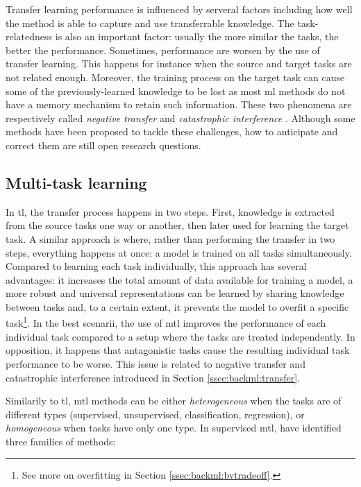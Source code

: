 Transfer learning performance is influenced by serveral factors including how well the method is able to capture and use transferrable knowledge. The task-relatedness is also an important factor: usually the more similar the tasks, the better the performance. Sometimes, performance are worsen by the use of transfer learning. This happens for instance when the source and target tasks are not related enough. Moreover, the training process on the target task can cause some of the previously-learned knowledge to be lost as most \acrlong{ml} methods do not have a memory mechanism to retain such information. These two phenomena are respectively called \textit{negative transfer} \parencite{zhang2020overcoming} and \textit{catastrophic interference} \parencite{french1999catastrophic}. Although some methods have been proposed to tackle these challenges, how to anticipate and correct them are still open research questions.

\subsection{Multi-task learning}
\label{ssec:backml:mtl}

In \acrlong{tl}, the transfer process happens in two steps. First, knowledge is extracted from the source tasks one way or another, then later used for learning the target task. A similar approach is  where, rather than performing the transfer in two steps, everything happens at once: a model is trained on all tasks simultaneously. Compared to learning each task individually, this approach has several advantages: it increases the total amount of data available for training a model, a more robust and universal representations can be learned by sharing knowledge between tasks and, to a certain extent, it prevents the model to overfit a specific task\footnote{See more on overfitting in Section \ref{ssec:backml:bvtradeoff}.}. In the best scenarii, the use of \acrlong{mtl} improves the performance of each individual task compared to a setup where the tasks are treated independently. In opposition, it happens that antagonistic tasks cause the resulting individual task performance to be worse. This issue is related to negative transfer and catastrophic interference introduced in Section \ref{ssec:backml:transfer}. 

Similarily to \acrlong{tl}, \acrlong{mtl} methods can be either \textit{heterogeneous} when the tasks are of different types (\eg supervised, unsupervised, classification, regression), or \textit{homogeneous} when tasks have only one type. In supervised \acrlong{mtl}, \parencite{zhang2017survey} have identified three families of methods:


